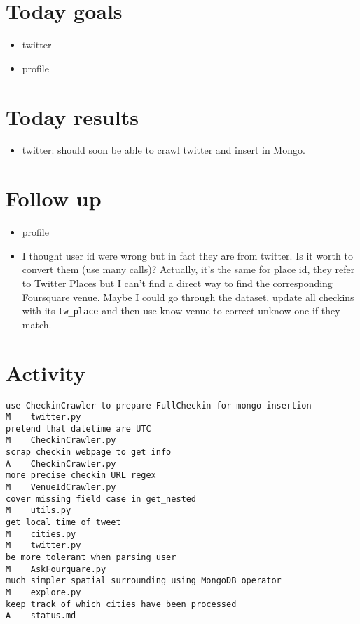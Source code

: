 \section*{Today goals}
\begin{itemize}
	\item twitter
	\item profile
\end{itemize}

\section*{Today results}
\begin{itemize}
	\item twitter: should soon be able to crawl twitter and insert in Mongo.
\end{itemize}

\section*{Follow up}
\begin{itemize}
	\item profile
	\item I thought user id were wrong but in fact they are from twitter. Is
		it worth to convert them (use many calls)? Actually, it's the same for
		place id, they refer to
		\href{https://dev.twitter.com/docs/platform-objects/places}{Twitter
		Places} but I can't find a direct way to find the corresponding
		Foursquare venue. Maybe I could go through the dataset, update all
		checkins with its \texttt{tw\_place} and then use know venue to
		correct unknow one if they match.
\end{itemize}

\section*{Activity}
\begin{verbatim}
use CheckinCrawler to prepare FullCheckin for mongo insertion
M    twitter.py
pretend that datetime are UTC
M    CheckinCrawler.py
scrap checkin webpage to get info
A    CheckinCrawler.py
more precise checkin URL regex
M    VenueIdCrawler.py
cover missing field case in get_nested
M    utils.py
get local time of tweet
M    cities.py
M    twitter.py
be more tolerant when parsing user
M    AskFourquare.py
much simpler spatial surrounding using MongoDB operator
M    explore.py
keep track of which cities have been processed
A    status.md
\end{verbatim}
